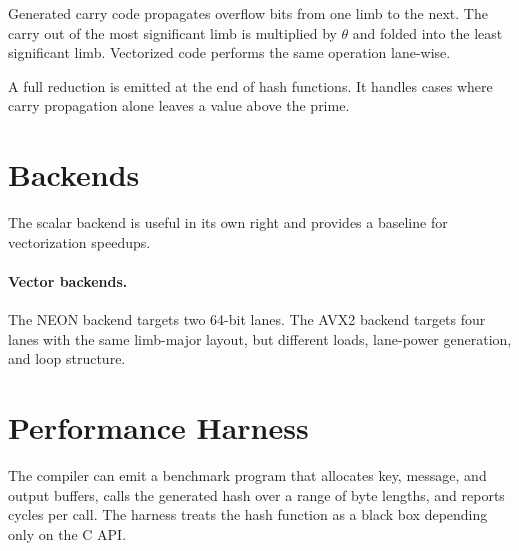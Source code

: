 Generated carry code propagates overflow bits from one limb to the next. The carry out of the most significant limb is multiplied by \(\theta\) and folded into the least significant limb. Vectorized code performs the same operation lane-wise.

A full reduction is emitted at the end of hash functions. It handles cases where carry propagation alone leaves a value above the prime.

\section{Backends}
\label{sec:backends}

The scalar backend is useful in its own right and provides a baseline for vectorization speedups.

\paragraph{Vector backends.}
The NEON backend targets two 64-bit lanes. The AVX2 backend targets four lanes with the same limb-major layout, but different loads, lane-power generation, and loop structure.

\section{Performance Harness}
\label{sec:performance-harness}

The compiler can emit a benchmark program that allocates key, message, and output buffers, calls the generated hash over a range of byte lengths, and reports cycles per call. The harness treats the hash function as a black box depending only on the C API.

